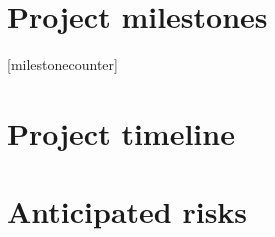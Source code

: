 \documentclass[../main.tex]{subfiles}
\begin{document}
\renewcommand\thefigure{\thesection\arabic{figure}}
\renewcommand\thetable{\thesection.\arabic{table}}

\section{Project milestones}

[milestonecounter]
\newcommand\showmilestonecounter{%
    \stepcounter{milestonecounter}%
    \themilestonecounter%
}
\renewcommand{\thesubcounter}{%
    \stepcounter{subcounter}%
    \themilestonecounter.\arabic{subcounter}%
}

 



\section{Project timeline}





\section{Anticipated risks}
\end{document}
